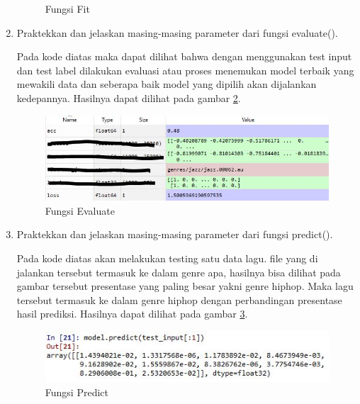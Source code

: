 \begin{enumerate}
\begin{figure}[!htbp]
	\caption{Fungsi Fit}
	\label{c6_14}
\end{figure}
\item Praktekkan dan jelaskan masing-masing parameter dari fungsi evaluate().

\subitem Pada kode diatas maka dapat dilihat bahwa dengan menggunakan test input dan test label dilakukan evaluasi atau proses menemukan model terbaik yang mewakili data dan seberapa baik model yang dipilih akan dijalankan kedepannya. Hasilnya dapat dilihat pada gambar \ref{c6_15}.
\begin{figure}[!htbp]
	\centerline{\includegraphics[width=1\textwidth]{figures/huda/chapter6/15.JPG}}
	\caption{Fungsi Evaluate}
	\label{c6_15}
\end{figure}
\item Praktekkan dan jelaskan masing-masing parameter dari fungsi predict(). 

\subitem Pada kode diatas akan melakukan testing satu data lagu. file yang di jalankan tersebut termasuk ke dalam genre apa, hasilnya bisa dilihat pada gambar tersebut presentase yang paling besar yakni genre hiphop. Maka lagu tersebut termasuk ke dalam genre hiphop dengan perbandingan presentase hasil prediksi. Hasilnya dapat dilihat pada gambar \ref{c6_16}.
\begin{figure}[!htbp]
	\centerline{\includegraphics[width=1\textwidth]{figures/huda/chapter6/16.JPG}}
	\caption{Fungsi Predict}
	\label{c6_16}
\end{figure}
\end{enumerate}

